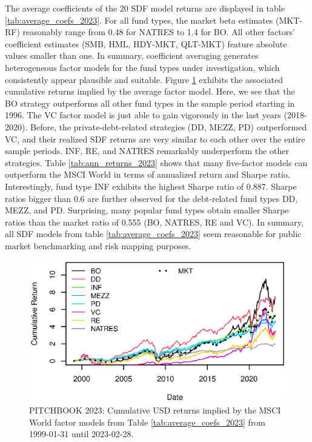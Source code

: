 \documentclass[12pt]{article}
\begin{document}
The average coefficients of the 20 SDF model returns are displayed in table \ref{tab:average_coefs_2023}.
For all fund types, the market beta estimates (MKT-RF) reasonably range from 0.48 for NATRES to 1.4 for BO.
All other factors' coefficient estimates (SMB, HML, HDY-MKT, QLT-MKT) feature absolute values smaller than one.
In summary, coefficient averaging generates heterogeneous factor models for the fund types under investigation, which consistently appear plausible and suitable.
Figure \ref{fig:cum_returns_2023} exhibits the associated cumulative returns implied by the average factor model.
Here, we see that the BO strategy outperforms all other fund types in the sample period starting in 1996.
The VC factor model is just able to gain vigorously in the last years (2018-2020).
Before, the private-debt-related strategies (DD, MEZZ, PD) outperformed VC, and their realized SDF returns are very similar to each other over the entire sample periods.
INF, RE, and NATRES remarkably underperform the other strategies.
Table \ref{tab:ann_returns_2023} shows that many five-factor models can outperform the MSCI World in terms of annualized return and Sharpe ratio. 
Interestingly, fund type INF exhibits the highest Sharpe ratio of 0.887.
Sharpe ratios bigger than 0.6 are further observed for the debt-related fund types DD, MEZZ, and PD.
Surprising, many popular fund types obtain smaller Sharpe ratios than the market ratio of 0.555 (BO, NATRES, RE and VC).
In summary, all SDF models from table \ref{tab:average_coefs_2023} seem reasonable for public market benchmarking and risk mapping purposes.



\begin{figure}[H]
	\centering
	\includegraphics{Figures/Cumulative_Returns_2023.eps}
	\caption{PITCHBOOK 2023: Cumulative USD returns implied by the MSCI World factor models from Table \ref{tab:average_coefs_2023} from 1999-01-31 until 2023-02-28.}
	\label{fig:cum_returns_2023}   
\end{figure}
\end{document}
